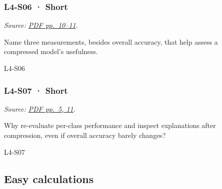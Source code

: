 \noindent\begin{minipage}{\linewidth}

\subsubsection{L4-S06 · Short}\label{l4-s06-short}

\emph{Source:
\href{../Lab\%20Sessions/Lab4/manolo_presentation.pdf\#page=10}{PDF
pp.~10--11}.}

Name three measurements, besides overall accuracy, that help assess a
compressed model's usefulness.

\begin{solution}[20mm]{L4-S06}

\end{solution}
\end{minipage}\par\medskip

\noindent\begin{minipage}{\linewidth}

\subsubsection{L4-S07 · Short}\label{l4-s07-short}

\emph{Source:
\href{../Lab\%20Sessions/Lab4/manolo_presentation.pdf\#page=5}{PDF
pp.~5, 11}.}

Why re-evaluate per-class performance and inspect explanations after
compression, even if overall accuracy barely changes?

\begin{solution}[20mm]{L4-S07}

\end{solution}
\end{minipage}\par\medskip

\subsection{Easy calculations}\label{easy-calculations-18}

